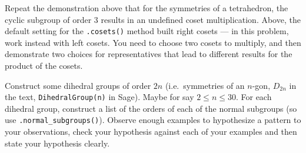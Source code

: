 \begin{sageverbatim}\end{sageverbatim}
%
%
Repeat the demonstration above that for the symmetries of a tetrahedron, the cyclic subgroup of order 3  results in an undefined coset multiplication.  Above, the default setting for the \verb?.cosets()? method built right cosets --- in this problem, work instead with left cosets.  You need to choose two cosets to multiply, and then demonstrate two choices for representatives that lead to different results for the product of the cosets.
\begin{sageverbatim}\end{sageverbatim}
%
%
Construct some dihedral groups of order $2n$ (i.e.\ symmetries of an $n$-gon, $D_{2n}$ in the text, \verb?DihedralGroup(n)? in Sage).  Maybe for say $2\leq n \leq 30$.  For each dihedral group, construct a list of the orders of each of the normal subgroups (so use \verb?.normal_subgroups()?).  Observe enough examples to hypothesize a pattern to your observations, check your hypothesis against each of your examples and then state your hypothesis clearly.
%
